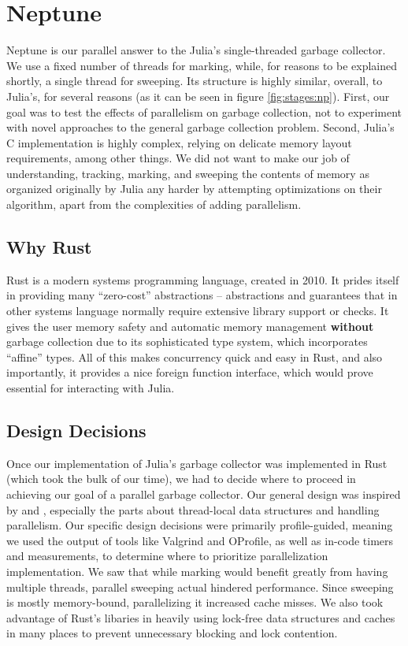 \section{Neptune} \label{neptune}

Neptune is our parallel answer to the Julia's single-threaded garbage collector.
We use a fixed number of threads for marking, while, for reasons to be explained shortly, a single thread for sweeping.
Its structure is highly similar, overall, to Julia's, for several reasons (as it can be seen in figure \ref{fig:stages:np}).
First, our goal was to test the effects of parallelism on garbage collection, not to experiment with novel approaches to the general garbage collection problem.
Second, Julia's C implementation is highly complex, relying on delicate memory layout requirements, among other things.
We did not want to make our job of understanding, tracking, marking, and sweeping the contents of memory as organized originally by Julia any harder by attempting optimizations on their algorithm, apart from the complexities of adding parallelism.

\subsection{Why Rust}
Rust is a modern systems programming language, created in 2010.
It prides itself in providing many ``zero-cost'' abstractions -- abstractions and guarantees that in other systems language normally require extensive library support or checks.
It gives the user memory safety and automatic memory management \textbf{without} garbage collection due to its sophisticated type system, which incorporates ``affine'' types.
All of this makes concurrency quick and easy in Rust, and also importantly, it provides a nice foreign function interface, which would prove essential for interacting with Julia.

\subsection{Design Decisions}
Once our implementation of Julia's garbage collector was implemented in Rust (which took the bulk of our time), we had to decide where to proceed in achieving our goal of a parallel garbage collector.
Our general design was inspired by \cite{marlow2008parallel} and \cite{marlow2011multicore}, especially the parts about thread-local data structures and handling parallelism.
Our specific design decisions were primarily profile-guided, meaning we used the output of tools like Valgrind and OProfile, as well as in-code timers and measurements, to determine where to prioritize parallelization implementation.
We saw that while marking would benefit greatly from having multiple threads, parallel sweeping actual hindered performance.
Since sweeping is mostly memory-bound, parallelizing it increased cache misses.
We also took advantage of Rust's libaries in heavily using lock-free data structures and caches in many places to prevent unnecessary blocking and lock contention.

